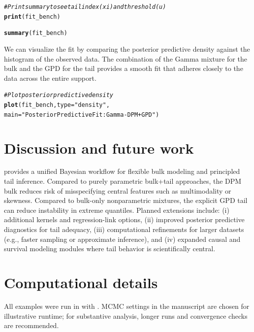 \documentclass[article]{jss}\usepackage[]{graphicx}\usepackage[]{xcolor}
\makeatletter
\newcommand{\hlsng}[1]{\textcolor[rgb]{0.192,0.494,0.8}{#1}}%
\newcommand{\hlcom}[1]{\textcolor[rgb]{0.678,0.584,0.686}{\textit{#1}}}%
\newcommand{\hldef}[1]{\textcolor[rgb]{0.345,0.345,0.345}{#1}}%
\newcommand{\hlkwc}[1]{\textcolor[rgb]{0.333,0.667,0.333}{#1}}%
\newcommand{\hlkwd}[1]{\textcolor[rgb]{0.737,0.353,0.396}{\textbf{#1}}}%
\newenvironment{kframe}{%
 \def\at@end@of@kframe{}%
 \ifinner\ifhmode%
  \def\at@end@of@kframe{\end{minipage}}%
  \begin{minipage}{\columnwidth}%
 \fi\fi%
 \def\FrameCommand##1{\hskip\@totalleftmargin \hskip-\fboxsep
 \colorbox{shadecolor}{##1}\hskip-\fboxsep
     \hskip-\linewidth \hskip-\@totalleftmargin \hskip\columnwidth}%
 \MakeFramed {\advance\hsize-\width
   \@totalleftmargin\z@ \linewidth\hsize
   \@setminipage}}%
 {\par\unskip\endMakeFramed%
 \at@end@of@kframe}
\newenvironment{knitrout}{}{} %
\makeatother
\begin{document}
\begin{knitrout}
\color{fgcolor}\begin{kframe}
\begin{alltt}
\hlcom{# Print summary to see tail index (xi) and threshold (u)}
\hlkwd{print}\hldef{(fit_bench)}
\end{alltt}


{\ttfamily\noindent\bfseries\color{errorcolor}{\#\# Error:\\\#\# ! object 'fit\_bench' not found}}\begin{alltt}
\hlkwd{summary}\hldef{(fit_bench)}
\end{alltt}


{\ttfamily\noindent\bfseries\color{errorcolor}{\#\# Error:\\\#\# ! object 'fit\_bench' not found}}\end{kframe}
\end{knitrout}

We can visualize the fit by comparing the posterior predictive density against the histogram of the observed data. The combination of the Gamma mixture for the bulk and the GPD for the tail provides a smooth fit that adheres closely to the data across the entire support.

\begin{knitrout}
\color{fgcolor}\begin{kframe}
\begin{alltt}
\hlcom{# Plot posterior predictive density}
\hlkwd{plot}\hldef{(fit_bench,} \hlkwc{type} \hldef{=} \hlsng{"density"}\hldef{,}
     \hlkwc{main} \hldef{=} \hlsng{"Posterior Predictive Fit: Gamma-DPM + GPD"}\hldef{)}
\end{alltt}


{\ttfamily\noindent\bfseries\color{errorcolor}{\#\# Error:\\\#\# ! object 'fit\_bench' not found}}\end{kframe}
\end{knitrout}

\section{Discussion and future work}

 provides a unified Bayesian workflow for flexible bulk modeling and principled tail inference.
Compared to purely parametric bulk+tail approaches, the DPM bulk reduces risk of misspecifying central features such as multimodality or skewness.
Compared to bulk-only nonparametric mixtures, the explicit GPD tail can reduce instability in extreme quantiles.
Planned extensions include: (i) additional kernels and regression-link options, (ii) improved posterior predictive diagnostics for tail adequacy, (iii) computational refinements for larger datasets (e.g., faster sampling or approximate inference), and (iv) expanded causal and survival modeling modules where tail behavior is scientifically central.

\section*{Computational details}

All examples were run in  with .
MCMC settings in the manuscript are chosen for illustrative runtime;
for substantive analysis, longer runs and convergence checks are recommended.


\end{document}
